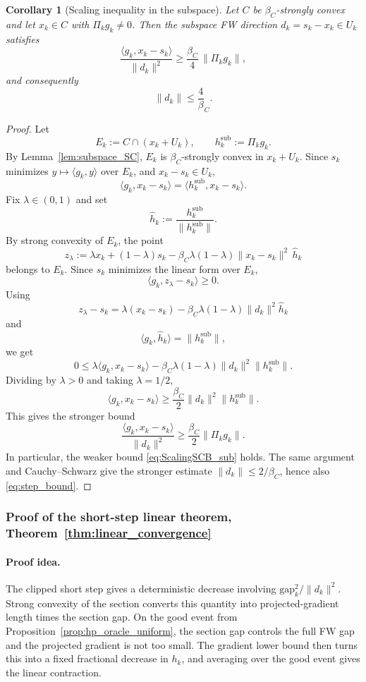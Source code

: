 \documentclass{article}
\newtheorem{corollary}{Corollary}
\begin{document}
\begin{corollary}[Scaling inequality in the subspace]
\label{cor:ScalingSCB_subspace}
Let \(C\) be \(\beta_C\)-strongly convex and let \(x_k\in C\) with
\(\Pi_k g_k\neq0\). Then the subspace FW direction
\(d_k=s_k-x_k\in U_k\) satisfies
\begin{equation}
\frac{\langle g_k,x_k-s_k\rangle}{\|d_k\|^2}
\ge
\frac{\beta_C}{4}\,\|\Pi_k g_k\|,
\label{eq:ScalingSCB_sub}
\end{equation}
and consequently
\begin{equation}
\|d_k\|\le \frac4\beta_C.
\label{eq:step_bound}
\end{equation}
\end{corollary}

\begin{proof}
Let
\[
E_k:=C\cap(x_k+U_k),
\qquad
h_k^{\mathrm{sub}}:=\Pi_k g_k.
\]
By Lemma~\ref{lem:subspace_SC}, \(E_k\) is \(\beta_C\)-strongly convex in
\(x_k+U_k\). Since \(s_k\) minimizes \(y\mapsto\langle g_k,y\rangle\) over
\(E_k\), and \(x_k-s_k\in U_k\),
\[
\langle g_k,x_k-s_k\rangle
=
\langle h_k^{\mathrm{sub}},x_k-s_k\rangle.
\]
Fix \(\lambda\in(0,1)\) and set
\[
\widehat h_k:=\frac{h_k^{\mathrm{sub}}}{\|h_k^{\mathrm{sub}}\|}.
\]
By strong convexity of \(E_k\), the point
\[
z_\lambda
:=
\lambda x_k+(1-\lambda)s_k
-
\beta_C\lambda(1-\lambda)\|x_k-s_k\|^2\,\widehat h_k
\]
belongs to \(E_k\). Since \(s_k\) minimizes the linear form over \(E_k\),
\[
\langle g_k,z_\lambda-s_k\rangle\ge0.
\]
Using
\[
z_\lambda-s_k
=
\lambda(x_k-s_k)
-
\beta_C\lambda(1-\lambda)\|d_k\|^2\widehat h_k
\]
and
\[
\langle g_k,\widehat h_k\rangle=\|h_k^{\mathrm{sub}}\|,
\]
we get
\[
0
\le
\lambda\langle g_k,x_k-s_k\rangle
-
\beta_C\lambda(1-\lambda)\|d_k\|^2
\|h_k^{\mathrm{sub}}\|.
\]
Dividing by \(\lambda>0\) and taking \(\lambda=1/2\),
\[
\langle g_k,x_k-s_k\rangle
\ge
\frac{\beta_C}{2}\|d_k\|^2\|h_k^{\mathrm{sub}}\|.
\]
This gives the stronger bound
\[
\frac{\langle g_k,x_k-s_k\rangle}{\|d_k\|^2}
\ge
\frac{\beta_C}{2}\|\Pi_k g_k\|.
\]
In particular, the weaker bound \eqref{eq:ScalingSCB_sub} holds. The same
argument and Cauchy--Schwarz give the stronger estimate
\(\|d_k\|\le2/\beta_C\), hence also \eqref{eq:step_bound}.
\end{proof}

\subsubsection{Proof of the short-step linear theorem, Theorem~\ref{thm:linear_convergence}}
\paragraph{Proof idea.}
The clipped short step gives a deterministic decrease involving
\(\mathrm{gap}_k^2/\|d_k\|^2\). Strong convexity of the section converts this
quantity into projected-gradient length times the section gap. On the good
event from Proposition~\ref{prop:hp_oracle_uniform}, the section gap controls
the full FW gap and the projected gradient is not too small. The gradient lower
bound then turns this into a fixed fractional decrease in \(h_k\), and averaging
over the good event gives the linear contraction.
\end{document}
